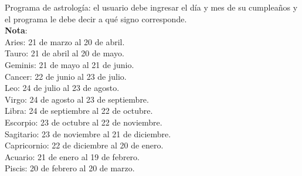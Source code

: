 \begin{ejercicio}
Programa de astrología: el usuario debe ingresar el día y
mes de su cumpleaños y el programa le debe decir a qué signo corresponde. \\
{\bf Nota}: \\
Aries: 21 de marzo al 20 de abril. \\
Tauro: 21 de abril al 20 de mayo. \\
Geminis: 21 de mayo al 21 de junio. \\
Cancer: 22 de junio al 23 de julio. \\
Leo: 24 de julio al 23 de agosto. \\
Virgo: 24 de agosto al 23 de septiembre. \\
Libra: 24 de septiembre al 22 de octubre. \\
Escorpio: 23 de octubre al 22 de noviembre. \\
Sagitario: 23 de noviembre al 21 de diciembre. \\
Capricornio: 22 de diciembre al 20 de enero. \\
Acuario: 21 de enero al 19 de febrero. \\
Piscis: 20 de febrero al 20 de marzo. \\
\end{ejercicio}
